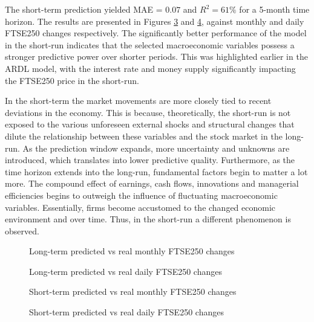 \documentclass[11pt,a4paper]{article}
\begin{document}
The short-term prediction yielded MAE = $0.07$ and 
$R^2 = 61\%$ for a 5-month time horizon. The results are presented in Figures \ref{fig:shortmonthly} 
and \ref{fig:shortdaily}, against monthly and daily FTSE250 changes respectively.
The significantly better performance of the model in the short-run
indicates that the selected macroeconomic variables possess
a stronger predictive power over shorter periods. This was highlighted 
earlier in the ARDL model, with the interest rate and money supply significantly
impacting the FTSE250 price in the short-run.

In the short-term the market movements
are more closely tied to recent deviations in the economy. This is because,
theoretically, 
the short-run is not exposed to the various unforeseen external shocks and structural changes
that dilute the relationship between these variables and the stock market in the 
long-run. As the prediction window expands, 
more uncertainty and unknowns are introduced, which translates into 
lower predictive quality. Furthermore, as the time horizon extends into the long-run, fundamental factors 
begin to matter a lot more. The compound effect of earnings, cash flows,
innovations and managerial efficiencies begins to outweigh the 
influence of fluctuating macroeconomic variables. Essentially, firms become accustomed 
to the changed economic environment and over time. Thus, in the short-run 
a different phenomenon is observed.

\clearpage

\begin{figure}[H]
    \centering
      
    \caption{Long-term predicted vs real monthly FTSE250 changes}
    \label{fig:longmonthly}
\end{figure}

\begin{figure}[H]
    \centering
      
    \caption{Long-term predicted vs real daily FTSE250 changes}
    \label{fig:longdaily}
\end{figure}

\clearpage


\begin{figure}[H]
    \centering
      
    \caption{Short-term predicted vs real monthly FTSE250 changes}
    \label{fig:shortmonthly}
\end{figure}




\begin{figure}[h!]
    \centering
      
    \caption{Short-term predicted vs real daily FTSE250 changes}
    \label{fig:shortdaily}
\end{figure}
\end{document}
